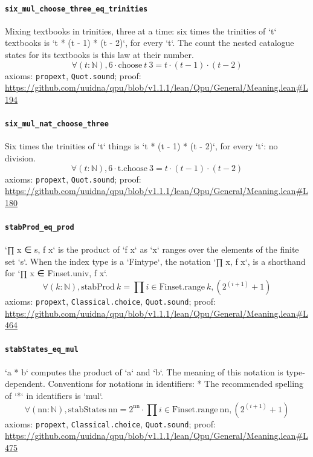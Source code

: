 \documentclass[11pt]{article}
\begin{document}
\paragraph{\texttt{six\_mul\_choose\_three\_eq\_trinities}}
Mixing textbooks in trinities, three at a time: six times the trinities of `t` textbooks is `t * (t - 1) * (t - 2)`, for every `t`. The count the nested catalogue states for its textbooks is this law at their number.
\[ \forall (t : \mathbb{N}), 6 \cdot \mathrm{choose}\ t\ 3 = t \cdot (t - 1) \cdot (t - 2) \]
\noindent axioms: \texttt{propext}, \texttt{Quot.sound}; proof: \url{https://github.com/uuidna/qpu/blob/v1.1.1/lean/Qpu/General/Meaning.lean\#L194}

\paragraph{\texttt{six\_mul\_nat\_choose\_three}}
Six times the trinities of `t` things is `t * (t - 1) * (t - 2)`, for every `t`: no division.
\[ \forall (t : \mathbb{N}), 6 \cdot \mathrm{t.choose}\ 3 = t \cdot (t - 1) \cdot (t - 2) \]
\noindent axioms: \texttt{propext}, \texttt{Quot.sound}; proof: \url{https://github.com/uuidna/qpu/blob/v1.1.1/lean/Qpu/General/Meaning.lean\#L180}

\paragraph{\texttt{stabProd\_eq\_prod}}
`∏ x ∈ s, f x` is the product of `f x` as `x` ranges over the elements of the finite set `s`.  When the index type is a `Fintype`, the notation `∏ x, f x`, is a shorthand for `∏ x ∈ Finset.univ, f x`.
\[ \forall (k : \mathbb{N}), \mathrm{stabProd}\ k = \prod i \in \mathrm{Finset.range}\ k, (2 ^{(i + 1)} + 1) \]
\noindent axioms: \texttt{propext}, \texttt{Classical.choice}, \texttt{Quot.sound}; proof: \url{https://github.com/uuidna/qpu/blob/v1.1.1/lean/Qpu/General/Meaning.lean\#L464}

\paragraph{\texttt{stabStates\_eq\_mul}}
`a * b` computes the product of `a` and `b`. The meaning of this notation is type-dependent.   Conventions for notations in identifiers:   * The recommended spelling of `*` in identifiers is `mul`.
\[ \forall (\mathrm{nn} : \mathbb{N}), \mathrm{stabStates}\ \mathrm{nn} = 2 ^{\mathrm{nn}} \cdot \prod i \in \mathrm{Finset.range}\ \mathrm{nn}, (2 ^{(i + 1)} + 1) \]
\noindent axioms: \texttt{propext}, \texttt{Classical.choice}, \texttt{Quot.sound}; proof: \url{https://github.com/uuidna/qpu/blob/v1.1.1/lean/Qpu/General/Meaning.lean\#L475}
\end{document}
